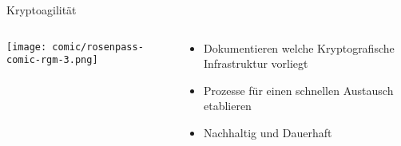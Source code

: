 
\begin{frame}[T]{Kryptoagilität}
  \begin{columns}[T,fullwidth]
    \hfill
    \begin{column}{.30\linewidth}
      \texttt{[image: comic/rosenpass-comic-rgm-3.png]}
    \end{column}
    \begin{column}{.65\linewidth}
      \vspace{5em}
      \begin{itemize}
        \item Dokumentieren welche Kryptografische Infrastruktur vorliegt
        \vspace{1.2em}
        \item Prozesse für einen schnellen Austausch etablieren
        \vspace{1.2em}
        \item Nachhaltig und Dauerhaft
      \end{itemize}
    \end{column}
    \hfill
  \end{columns}
\end{frame}
